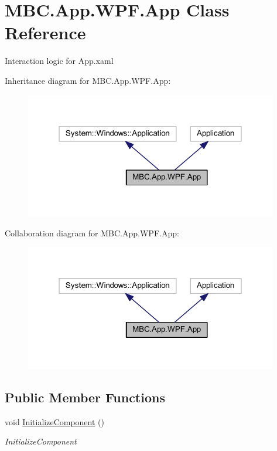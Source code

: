 \hypertarget{class_m_b_c_1_1_app_1_1_w_p_f_1_1_app}{\section{M\-B\-C.\-App.\-W\-P\-F.\-App Class Reference}
\label{class_m_b_c_1_1_app_1_1_w_p_f_1_1_app}
}


Interaction logic for App.\-xaml  




Inheritance diagram for M\-B\-C.\-App.\-W\-P\-F.\-App\-:
\nopagebreak
\begin{figure}[H]
\begin{center}
\leavevmode
\includegraphics[width=313pt]{class_m_b_c_1_1_app_1_1_w_p_f_1_1_app__inherit__graph}
\end{center}
\end{figure}


Collaboration diagram for M\-B\-C.\-App.\-W\-P\-F.\-App\-:
\nopagebreak
\begin{figure}[H]
\begin{center}
\leavevmode
\includegraphics[width=313pt]{class_m_b_c_1_1_app_1_1_w_p_f_1_1_app__coll__graph}
\end{center}
\end{figure}
\subsection*{Public Member Functions}
\begin{DoxyCompactItemize}
\item 
void \hyperlink{class_m_b_c_1_1_app_1_1_w_p_f_1_1_app_a8358577b4bcee12163c3027a479c5e52}{Initialize\-Component} ()
\begin{DoxyCompactList}\small\item\em Initialize\-Component \end{DoxyCompactList}\end{DoxyCompactItemize}
